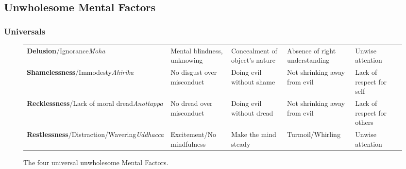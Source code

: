 
\pagebreak
\subsection*{Unwholesome Mental Factors}

\subsubsection*{Universals}

\begin{figure} [H]

\setlength{\tabcolsep}{0pt}
\renewcommand{\arraystretch}{1.1}

\begin{tabular}{P{0.25\textwidth} | C{.185\textwidth} C{0.185\textwidth} C{0.185\textwidth} C{0.195\textwidth} m{0mm}}
\toprule
 &  &  &  & \\
\midrule
\textbf{Delusion}/\newline Ignorance\newline \textit{Moha} & Mental blindness, unknowing & Concealment of object’s nature & Absence of right understanding & Unwise attention &\\[12mm]
\textbf{Shamelessness}/\newline Immodesty\newline \textit{Ahirika} & No disgust over misconduct & Doing evil without shame & Not shrinking away from evil & Lack of respect for self &\\[12mm]
\textbf{Recklessness}/\newline Lack of moral dread\newline \textit{Anottappa} & No dread over misconduct & Doing evil without dread & Not shrinking away from evil & Lack of respect for others &\\[12mm]
\textbf{Restlessness}/\newline Distraction/Wavering\newline \textit{Uddhacca} & Excitement/\newline No mindfulness & Make the mind steady & Turmoil/\newline Whirling & Unwise attention &\\[12mm]
\bottomrule
\end{tabular}

\caption{The four universal unwholesome Mental Factors.}

\end{figure}

